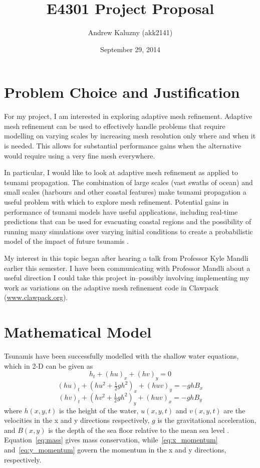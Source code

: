 \documentclass[11pt]{article}
\title{E4301 Project Proposal}
\author{Andrew Kaluzny (akk2141)}
\date{September 29, 2014}
\begin{document}
\maketitle

\section*{Problem Choice and Justification}
For my project, I am interested in exploring adaptive mesh refinement.
Adaptive mesh refinement can be used to effectively handle problems that require modelling on varying scales by increasing mesh resolution only where and when it is needed. This allows for substantial performance gains when the alternative would require using a very fine mesh everywhere.

In particular, I would like to look at adaptive mesh refinement as applied to tsunami propagation. 
The combination of large scales (vast swaths of ocean) and small scales (harbours and other coastal features) make tsunami propagation a useful problem with which to explore mesh refinement. 
Potential gains in performance of tsunami models have useful applications, including real-time predictions that can be used for evacuating coastal regions and the possibility of running many simulations over varying initial conditions to create a probabilistic model of the impact of future tsunamis \cite{leveque11}.

My interest in this topic began after hearing a talk from Professor Kyle Mandli earlier this semester. I have been communicating with Professor Mandli about a useful direction I could take this project in--possibly involving implementing my work as variations on the adaptive mesh refinement code in Clawpack (\url{www.clawpack.org}).

\section*{Mathematical Model}
Tsunamis have been successfully modelled with the shallow water equations, which in 2-D can be given as
\begin{equation}
\label{eq:mass}
h_t + (hu)_x + (hv)_y = 0
\end{equation}
\begin{equation}
\label{eq:x_momentum}
(hu)_t + (hu^2 + \tfrac{1}{2	}gh^2)_x + (huv)_y = -ghB_x
\end{equation}
\begin{equation}
\label{eq:y_momentum}
(hv)_t + (hv^2 + \tfrac{1}{2	}gh^2)_y + (huv)_x = -ghB_y
\end{equation}
where $h(x,y,t)$ is the height of the water, $u(x,y,t)$ and $v(x,y,t)$ are the velocities in the x and y directions respectively, $g$ is the gravitational acceleration, and $B(x,y)$ is the depth of the sea floor relative to the mean sea level \cite{leveque11}.
Equation~\eqref{eq:mass} gives mass conservation, while~\eqref{eq:x_momentum} and~\eqref{eq:y_momentum} govern the momentum in the x and y directions, respectively.
\end{document}
